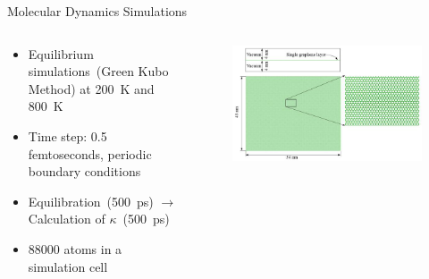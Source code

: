 \documentclass[handout,xcolor={x11names,table},compress,svgnames,mathserif]{beamer}
\renewcommand{\(}{\begin{columns}}
\renewcommand{\)}{\end{columns}}
\newcommand{\<}[1]{\begin{column}{#1}}
\renewcommand{\>}{\end{column}}
\newcommand*\myitem{%
  \item[\color{DeepSkyBlue4}\scalebox{0.6}{\ding{110}}]}
\begin{document}
\begin{frame}{Molecular Dynamics Simulations}

\begin{columns}
\begin{column}{0.6\textwidth}

\begin{itemize}
\small
\myitem Equilibrium simulations~(Green Kubo Method)
at 200~K and 800~K
\vspace{2mm}

\myitem Time step: 0.5 femtoseconds,  
periodic boundary conditions
\vspace{2mm}

\myitem Equilibration~(500~ps) 
$\rightarrow$ Calculation of $\kappa$~(500~ps)
\vspace{2mm}

\myitem 88000 atoms in a simulation cell

\end{itemize}

\end{column}

\begin{column}{0.4\textwidth}
%
\begin{figure}[htbp]
\begin{center}
\includegraphics[width=1.1\textwidth]{./Figures/Graphene}
\end{center}
\end{figure}
%

\end{column}
\end{columns}

\end{frame}

\end{document}

